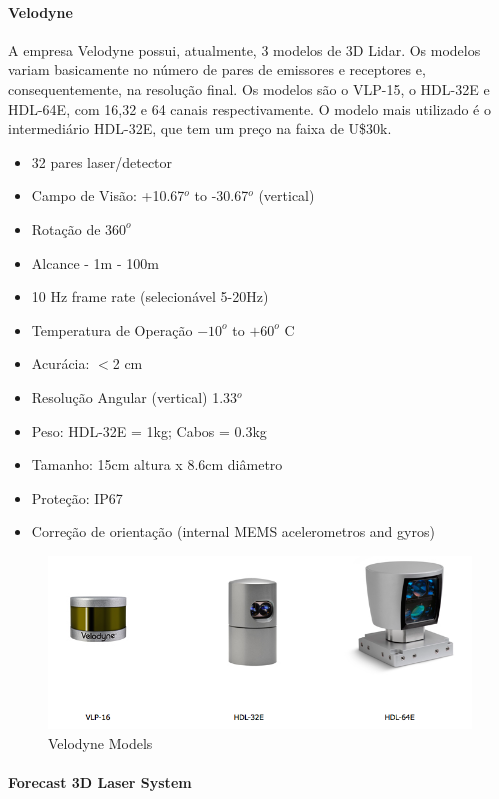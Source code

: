 \paragraph{Velodyne}

A empresa Velodyne possui, atualmente, 3 modelos de 3D Lidar. Os modelos variam
basicamente no número de pares de emissores e receptores e, consequentemente, na
resolução final. Os modelos são o VLP-15, o HDL-32E e HDL-64E, com 16,32 e 64
canais respectivamente. O modelo mais utilizado é o intermediário HDL-32E, que
tem um preço na faixa de U\$30k.

\begin{itemize}
\item 32 pares laser/detector  
\item Campo de Visão: +10.67$^o$ to -30.67$^o$ (vertical)
\item Rotação de $360^o$
\item Alcance - 1m - 100m 
\item 10 Hz frame rate (selecionável 5-20Hz)
\item Temperatura de Operação $-10^o$ to $+60^o$ C
\item Acurácia: $<$2 cm
\item Resolução Angular (vertical) 1.33$^o$
\item Peso: HDL-32E = 1kg; Cabos = 0.3kg
\item Tamanho: 15cm altura x 8.6cm diâmetro
\item Proteção: IP67
\item Correção de orientação (internal MEMS acelerometros and gyros)
\end{itemize}

\begin{figure}[h!]
   \centering
   \includegraphics[width=0.8\columnwidth]{figs/3dsensors/velodyne}
   \caption{Velodyne Models}
   \label{fig::velodyne_models}
\end{figure}

\paragraph{Forecast 3D Laser System}


